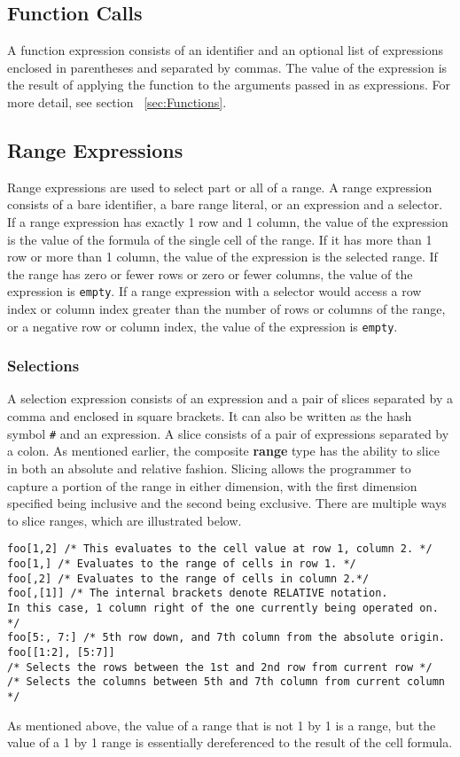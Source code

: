 \subsection {Function Calls}
A function expression consists of an identifier and an optional list of expressions enclosed in parentheses and separated by commas. The value of the expression is the result of applying the function to the arguments passed in as expressions. For more detail, see section ~\ref{sec:Functions}.
\subsection{Range Expressions}
Range expressions are used to select part or all of a range. A range expression consists of a bare identifier, a bare range literal, or an expression and a selector. If a range expression has exactly 1 row and 1 column, the value of the expression is the value of the formula of the single cell of the range. If it has more than 1 row or more than 1 column, the value of the expression is the selected range. If the range has zero or fewer rows or zero or fewer columns, the value of the expression is \texttt{empty}. If a range expression with a selector would access a row index or column index greater than the number of rows or columns of the range, or a negative row or column index, the value of the expression is \texttt{empty}. 
\subsubsection{Selections}
A selection expression consists of an expression and a pair of slices separated by a comma and enclosed in square brackets. It can also be written as the hash symbol \texttt{\#} and an expression. A slice consists of a pair of expressions separated by a colon. 
			As mentioned earlier, the composite \textbf{range} type has the ability to slice in both an absolute and relative fashion. Slicing allows the programmer to capture a portion of the range in either dimension, with the first dimension specified being inclusive and the second being exclusive. There are multiple ways to slice ranges, which are illustrated below.\newline
			\begin{lstlisting}
foo[1,2] /* This evaluates to the cell value at row 1, column 2. */
foo[1,] /* Evaluates to the range of cells in row 1. */
foo[,2] /* Evaluates to the range of cells in column 2.*/
foo[,[1]] /* The internal brackets denote RELATIVE notation. 
In this case, 1 column right of the one currently being operated on. */ 
foo[5:, 7:] /* 5th row down, and 7th column from the absolute origin.
foo[[1:2], [5:7]] 
/* Selects the rows between the 1st and 2nd row from current row */
/* Selects the columns between 5th and 7th column from current column */
			\end{lstlisting}
			As mentioned above, the value of a range that is not 1 by 1 is a range, but the value of a 1 by 1 range is essentially dereferenced to the result of the cell formula.
